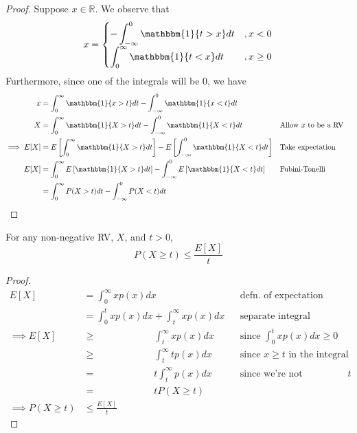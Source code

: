 \begin{proof}
Suppose $x\in \mathbb{R}$. We observe that 
    \[ x = 
    \begin{cases}
        \displaystyle{-\int_{-\infty}^{0} \mathbbm{1}\{t > x\} dt} &, x < 0 \\
        \displaystyle{\int_{0}^{\infty} \mathbbm{1}\{t < x\} dt} &, x \geq 0 
    \end{cases}
    \] 
Furthermore, since one of the integrals will be 0, we have  
    \begin{align*}
    x &= \int_{0}^{\infty} \mathbbm{1}\{x>t\}dt - \int_{-\infty}^{0}\mathbbm{1}\{x<t\}dt \\
    X &= \int_{0}^{\infty} \mathbbm{1}\{X>t\}dt - \int_{-\infty}^{0}\mathbbm{1}\{X<t\}dt && \text{Allow $x$ to be a RV}\\
    \implies E[X] &= E\left[\int_{0}^{\infty} \mathbbm{1}\{X>t\}dt\right] - E\left[\int_{-\infty}^{0}\mathbbm{1}\{X<t\}dt\right] && \text{Take expectation}\\
    E[X] &= \int_{0}^{\infty} E\left[\mathbbm{1}\{X>t\}dt\right] - \int_{-\infty}^{0}E\left[\mathbbm{1}\{X<t\}dt\right] && \text{Fubini-Tonelli}\\
    &= \int_{0}^{\infty} P(X > t)dt - \int_{-\infty}^{0}P(X<t)dt 
    \end{align*}
\end{proof}

\begin{tcolorbox}
\begin{proposition}
For any non-negative RV, $X$, and $t>0$, 
    \begin{equation}
    P(X \geq t) \leq \frac{E[X]}{t}
    \end{equation}
\end{proposition}
\end{tcolorbox}

\begin{proof}
\begin{align*}
    E[X] &= \int_{0}^{\infty} xp(x)dx && \text{defn. of expectation} \\ 
    &= \int_{0}^{t} xp(x)dx + \int_{t}^{\infty}xp(x)dx && \text{separate integral} \\
    \implies E[X] &\geq \qquad \qquad \qquad \int_{t}^{\infty}xp(x)dx && \text{since $\int_{0}^{t}xp(x)dx \geq 0$} \\
    &\geq \qquad \qquad \qquad \int_{t}^{\infty} tp(x)dx &&\text{since $x \geq t$ in the integral} \\ 
    &= \qquad \qquad \qquad t \int_{t}^{\infty}p(x)dx && \text{since we're not integrating over $t$} \\ 
    &= \qquad \qquad \qquad t P(X \geq t)  \\
    \implies P(X \geq t) &\leq \frac{E[X]}{t}
\end{align*}
\end{proof}


